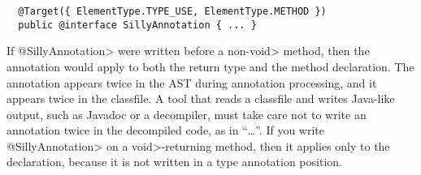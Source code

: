 \documentclass[10pt]{article}
\newcommand{\ttlcb}{\texttt{\char "7B}}
\newcommand{\ttrcb}{\texttt{\char "7D}}
\newcommand{\preverbnegspace}{\vspace{-5pt}}
\begin{document}
\preverbnegspace
\begin{Verbatim}
  @Target({ ElementType.TYPE_USE, ElementType.METHOD })
  public @interface SillyAnnotation { ... }
\end{Verbatim}

\noindent
If \<@SillyAnnotation> were written before a non-\<void> method, then
the annotation would apply to both the return type and the
method declaration.  The annotation appears twice in the AST
during annotation processing, and it appears twice in the classfile.
A tool that reads a classfile and writes Java-like output, such as Javadoc
or a decompiler, must take care not to write an annotation twice in the
decompiled code, as in ``\ldots''.
If you write \<@SillyAnnotation> on a \<void>-returning method, then
it applies only to the declaration, because it is not written in a type
annotation position.
\end{document}
